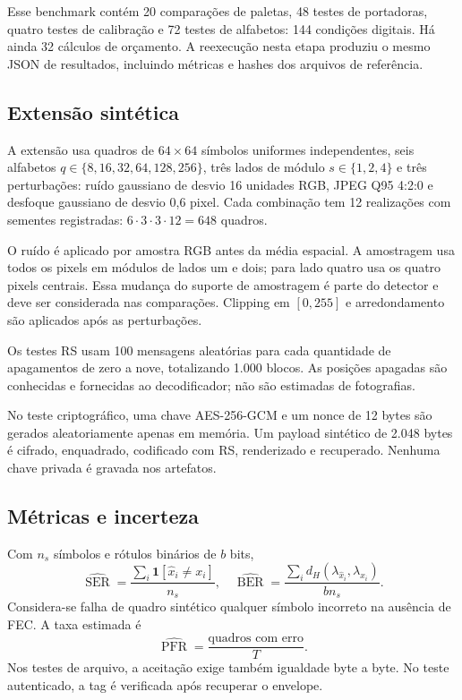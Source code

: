 \documentclass[11pt,a4paper]{article}
\newcommand{\SER}{\operatorname{SER}}
\newcommand{\BER}{\operatorname{BER}}
\newcommand{\PFR}{\operatorname{PFR}}
\begin{document}
Esse benchmark contém 20 comparações de paletas, 48 testes de portadoras, quatro testes de calibração e 72 testes de alfabetos: 144 condições digitais. Há ainda 32 cálculos de orçamento. A reexecução nesta etapa produziu o mesmo JSON de resultados, incluindo métricas e hashes dos arquivos de referência.

\subsection{Extensão sintética}
A extensão usa quadros de $64\times64$ símbolos uniformes independentes, seis alfabetos $q\in\{8,16,32,64,128,256\}$, três lados de módulo $s\in\{1,2,4\}$ e três perturbações: ruído gaussiano de desvio 16 unidades RGB, JPEG Q95 4:2:0 e desfoque gaussiano de desvio 0,6 pixel. Cada combinação tem 12 realizações com sementes registradas: $6\cdot3\cdot3\cdot12=648$ quadros.

O ruído é aplicado por amostra RGB antes da média espacial. A amostragem usa todos os pixels em módulos de lados um e dois; para lado quatro usa os quatro pixels centrais. Essa mudança do suporte de amostragem é parte do detector e deve ser considerada nas comparações. Clipping em $[0,255]$ e arredondamento são aplicados após as perturbações.

Os testes RS usam 100 mensagens aleatórias para cada quantidade de apagamentos de zero a nove, totalizando 1.000 blocos. As posições apagadas são conhecidas e fornecidas ao decodificador; não são estimadas de fotografias.

No teste criptográfico, uma chave AES-256-GCM e um nonce de 12 bytes são gerados aleatoriamente apenas em memória. Um payload sintético de 2.048 bytes é cifrado, enquadrado, codificado com RS, renderizado e recuperado. Nenhuma chave privada é gravada nos artefatos.

\subsection{Métricas e incerteza}
Com $n_s$ símbolos e rótulos binários de $b$ bits,
\begin{equation}
\widehat{\SER}=\frac{\sum_i\mathbf1[\widehat x_i\ne x_i]}{n_s},\quad
\widehat{\BER}=\frac{\sum_i d_H(\lambda_{\widehat x_i},\lambda_{x_i})}{bn_s}.
\end{equation}
Considera-se falha de quadro sintético qualquer símbolo incorreto na ausência de FEC. A taxa estimada é
\begin{equation}
\widehat{\PFR}=\frac{\text{quadros com erro}}{T}.
\end{equation}
Nos testes de arquivo, a aceitação exige também igualdade byte a byte. No teste autenticado, a tag é verificada após recuperar o envelope.
\end{document}
